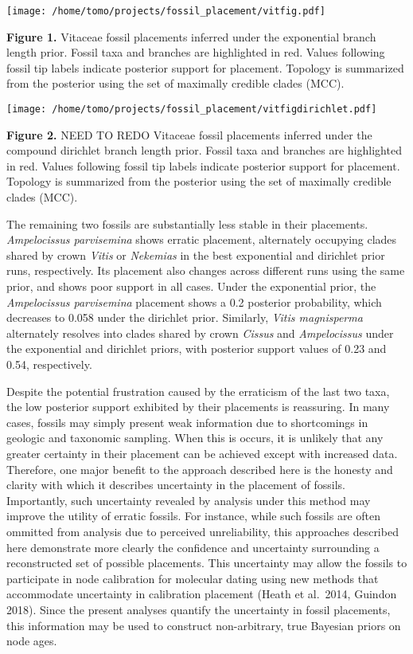\documentclass[12pt]{article}
\begin{document}
\texttt{[image: /home/tomo/projects/fossil\_placement/vitfig.pdf]}

\textbf{Figure 1.} Vitaceae fossil placements inferred under the
exponential branch length prior. Fossil taxa and branches are
highlighted in red. Values following fossil tip labels indicate
posterior support for placement. Topology is summarized from the
posterior using the set of maximally credible clades (MCC).

\texttt{[image: /home/tomo/projects/fossil\_placement/vitfigdirichlet.pdf]}

\textbf{Figure 2.} NEED TO REDO Vitaceae fossil placements inferred
under the compound dirichlet branch length prior. Fossil taxa and
branches are highlighted in red. Values following fossil tip labels
indicate posterior support for placement. Topology is summarized from
the posterior using the set of maximally credible clades (MCC).

The remaining two fossils are substantially less stable in their
placements. \emph{Ampelocissus parvisemina} shows erratic placement,
alternately occupying clades shared by crown \emph{Vitis} or
\emph{Nekemias} in the best exponential and dirichlet prior runs,
respectively. Its placement also changes across different runs using the
same prior, and shows poor support in all cases. Under the exponential
prior, the \emph{Ampelocissus parvisemina} placement shows a 0.2
posterior probability, which decreases to 0.058 under the dirichlet
prior. Similarly, \emph{Vitis magnisperma} alternately resolves into
clades shared by crown \emph{Cissus} and \emph{Ampelocissus} under the
exponential and dirichlet priors, with posterior support values of 0.23
and 0.54, respectively.

Despite the potential frustration caused by the erraticism of the last
two taxa, the low posterior support exhibited by their placements is
reassuring. In many cases, fossils may simply present weak information
due to shortcomings in geologic and taxonomic sampling. When this is
occurs, it is unlikely that any greater certainty in their placement can
be achieved except with increased data. Therefore, one major benefit to
the approach described here is the honesty and clarity with which it
describes uncertainty in the placement of fossils. Importantly, such
uncertainty revealed by analysis under this method may improve the
utility of erratic fossils. For instance, while such fossils are often
ommitted from analysis due to perceived unreliability, this approaches
described here demonstrate more clearly the confidence and uncertainty
surrounding a reconstructed set of possible placements. This uncertainty
may allow the fossils to participate in node calibration for molecular
dating using new methods that accommodate uncertainty in calibration
placement (Heath et al.~2014, Guindon 2018). Since the present analyses
quantify the uncertainty in fossil placements, this information may be
used to construct non-arbitrary, true Bayesian priors on node ages.
\end{document}
